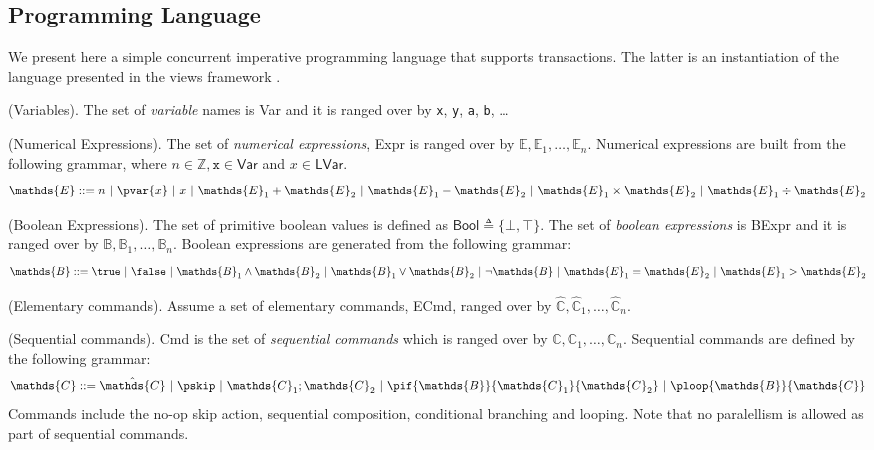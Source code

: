 \subsection{Programming Language}
\label{language}

We present here a simple concurrent imperative programming language that supports transactions. The latter is an instantiation of the language presented in the views framework \cite{views}.

\begin{defn}
	(Variables).
	The set of \emph{variable} names is \textsf{Var} and it is ranged over by \texttt{x}, \texttt{y}, \texttt{a}, \texttt{b}, \ldots
\end{defn}

\begin{defn}
	(Numerical Expressions).
	The set of \emph{numerical expressions}, \textsf{Expr} is ranged over by $\mathds{E}, \mathds{E}_1, \ldots, \mathds{E}_n$. Numerical expressions are built from the following grammar, where $n \in \mathds{Z}, \mathtt{x} \in \mathsf{Var}$ and $x \in \mathsf{LVar}$.
	\[
		\mathds{E} ::=
			n\
			|\ \pvar{x}\
			|\ x\
			|\ \mathds{E}_1 + \mathds{E}_2\
			|\ \mathds{E}_1 - \mathds{E}_2\
			|\ \mathds{E}_1 \times \mathds{E}_2\
			|\ \mathds{E}_1 \div \mathds{E}_2
	\]
\end{defn}

\begin{defn}
	(Boolean Expressions).
	The set of primitive boolean values is defined as $\mathsf{Bool} \triangleq \{ \bot, \top \}$. The set of \emph{boolean expressions} is \textsf{BExpr} and it is ranged over by $\mathds{B}, \mathds{B}_1, \ldots, \mathds{B}_n$. Boolean expressions are generated from the following grammar:
	\[
		\mathds{B} ::=
			\true\
			|\ \false\
			|\ \mathds{B}_1 \land \mathds{B}_2\
			|\ \mathds{B}_1 \lor \mathds{B}_2\
			|\ \lnot \mathds{B}\
			|\ \mathds{E}_1 = \mathds{E}_2\
			|\ \mathds{E}_1 > \mathds{E}_2
	\]
\end{defn}

\begin{param}
	(Elementary commands).
	Assume a set of elementary commands, \textsf{ECmd}, ranged over by $\hat{\mathds{C}}, \hat{\mathds{C}}_1, \ldots, \hat{\mathds{C}}_n$.
\end{param}

\begin{defn}
	(Sequential commands).
	\textsf{Cmd} is the set of \emph{sequential commands} which is ranged over by $\mathds{C}, \mathds{C}_1, \ldots, \mathds{C}_n$. Sequential commands are defined by the following grammar:
	\[
		\mathds{C} ::=
			\hat{\mathds{C}}\
			|\ \pskip\
			|\ \mathds{C}_1; \mathds{C}_2\
			|\ \pif{\mathds{B}}{\mathds{C}_1}{\mathds{C}_2}\
			|\ \ploop{\mathds{B}}{\mathds{C}}
	\]
	Commands include the no-op skip action, sequential composition, conditional branching and looping. Note that no paralellism is allowed as part of sequential commands.
\end{defn}


